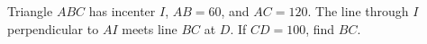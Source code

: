 Triangle $ABC$ has incenter $I$, $AB=60$, and $AC=120$. The line through $I$ perpendicular to $AI$ meets line $BC$ at $D$. If $CD=100$, find $BC$.
